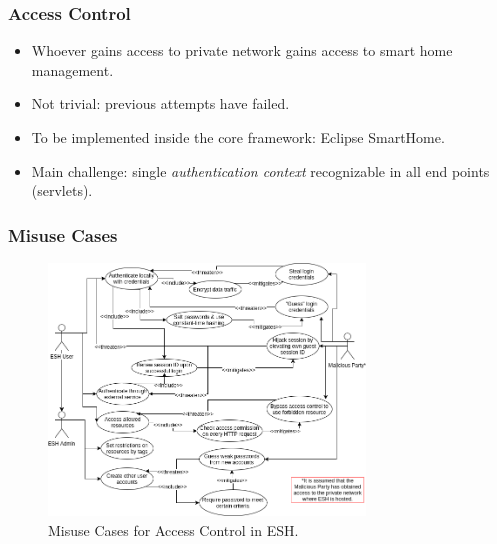 \documentclass{beamer}
\begin{document}
\begin{frame}
\frametitle{Access Control}
\begin{itemize}
  \setlength\itemsep{1.5em}
\item Whoever gains access to private network gains access to smart home management.
\item Not trivial: previous attempts have failed.
\item To be implemented inside the core framework: Eclipse SmartHome.
\item Main challenge: single \emph{authentication context} recognizable in all end points (servlets).
\end{itemize}
\end{frame}
\begin{frame}
\frametitle{Misuse Cases}

\begin{figure} [ht] 
\begin{center}
\includegraphics[width=0.75\textwidth]{esh_misuse_cases}
\caption{Misuse Cases for Access Control in ESH.}
\label{fig:misuse_cases}
\end{center}
\end{figure}

\end{frame}
\end{document}
